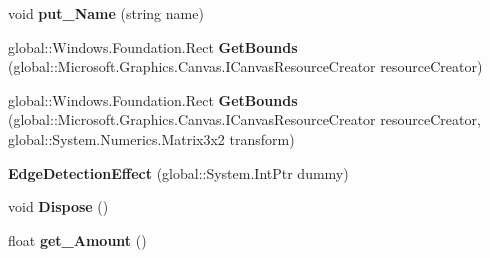 \begin{DoxyCompactItemize}
\mbox{\label{class_microsoft_1_1_graphics_1_1_canvas_1_1_effects_1_1_edge_detection_effect_a35dbf0d4e7354d2554ec71ad482ea7cc}} 
void {\bfseries put\+\_\+\+Name} (string name)
\item 
\mbox{\label{class_microsoft_1_1_graphics_1_1_canvas_1_1_effects_1_1_edge_detection_effect_a05dbef4b9e01ccf2927bea9316a0cc4c}} 
global\+::\+Windows.\+Foundation.\+Rect {\bfseries Get\+Bounds} (global\+::\+Microsoft.\+Graphics.\+Canvas.\+I\+Canvas\+Resource\+Creator resource\+Creator)
\item 
\mbox{\label{class_microsoft_1_1_graphics_1_1_canvas_1_1_effects_1_1_edge_detection_effect_a633113ef50a9947d0a1e0964566587d8}} 
global\+::\+Windows.\+Foundation.\+Rect {\bfseries Get\+Bounds} (global\+::\+Microsoft.\+Graphics.\+Canvas.\+I\+Canvas\+Resource\+Creator resource\+Creator, global\+::\+System.\+Numerics.\+Matrix3x2 transform)
\item 
\mbox{\label{class_microsoft_1_1_graphics_1_1_canvas_1_1_effects_1_1_edge_detection_effect_a9542f96d28e629e75fc7549550e42caf}} 
{\bfseries Edge\+Detection\+Effect} (global\+::\+System.\+Int\+Ptr dummy)
\item 
\mbox{\label{class_microsoft_1_1_graphics_1_1_canvas_1_1_effects_1_1_edge_detection_effect_a4ef78a65aa6c4075fd46d5020462a100}} 
void {\bfseries Dispose} ()
\item 
\mbox{\label{class_microsoft_1_1_graphics_1_1_canvas_1_1_effects_1_1_edge_detection_effect_abb9b39bb3406ac6a4e812bd40512b749}} 
float {\bfseries get\+\_\+\+Amount} ()
\item 
\mbox{\label{class_microsoft_1_1_graphics_1_1_canvas_1_1_effects_1_1_edge_detection_effect_a35679bc6700b81e40b2e61ff0a065a2e}} 

\end{DoxyCompactItemize}
